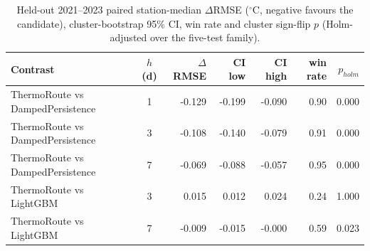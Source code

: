 
\begin{table}[htbp]
\caption{Held-out 2021--2023 paired station-median $\Delta$RMSE (${}^\circ$C, negative favours the candidate), cluster-bootstrap 95\% CI, win rate and cluster sign-flip $p$ (Holm-adjusted over the five-test family).}
\label{tab:paired-holdout}
\centering
\small
\begin{tabular}{lcrrrrr}
\toprule
Contrast & $h$ (d) & $\Delta$RMSE & CI low & CI high & win rate & $p_{holm}$ \\
\midrule
ThermoRoute vs DampedPersistence & 1 & -0.129 & -0.199 & -0.090 & 0.90 & 0.000 \\
ThermoRoute vs DampedPersistence & 3 & -0.108 & -0.140 & -0.079 & 0.91 & 0.000 \\
ThermoRoute vs DampedPersistence & 7 & -0.069 & -0.088 & -0.057 & 0.95 & 0.000 \\
ThermoRoute vs LightGBM & 3 & 0.015 & 0.012 & 0.024 & 0.24 & 1.000 \\
ThermoRoute vs LightGBM & 7 & -0.009 & -0.015 & -0.000 & 0.59 & 0.023 \\
\bottomrule
\end{tabular}
\end{table}

